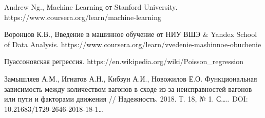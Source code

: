 \begin{thebibliography}{00}
    
     Andrew Ng., Machine Learning от Stanford University. https://www.coursera.org/learn/machine-learning
    
     Воронцов К.В., Введение в машинное обучение от НИУ ВШЭ \& Yandex School of Data Analysis. https://www.coursera.org/learn/vvedenie-mashinnoe-obuchenie
    
     Пуассоновская регрессия. https://en.wikipedia.org/wiki/Poisson\_regression
    
     Замышляев А.М., Игнатов А.Н., Кибзун А.И., Новожилов Е.О. Функциональная зависимость между количеством вагонов в сходе из-за неисправностей вагонов или пути и факторами движения // Надежность. 2018. Т. 18, № 1. С….. DOI: 10.21683/1729-2646-2018-18-1…
    
    
\end{thebibliography}
